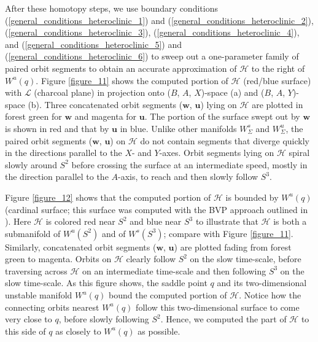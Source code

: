 \documentclass{ws-ijbc}
\begin{document}
After these homotopy steps, we use boundary conditions (\ref{general_conditions_heteroclinic_1}) and (\ref{general_conditions_heteroclinic_2}), (\ref{general_conditions_heteroclinic_3}), (\ref{general_conditions_heteroclinic_4}), and (\ref{general_conditions_heteroclinic_5}) and (\ref{general_conditions_heteroclinic_6}) to sweep out a one-parameter family of paired orbit segments to obtain an accurate approximation of $\mathscr{H}$ to the right of $W^u(q)$.  Figure \ref{figure_11} shows the computed portion of $\mathscr{H}$ (red/blue surface) with $\mathscr{L}$ (charcoal plane) in projection onto ($B$, $A$, $X$)-space (a) and ($B$, $A$, $Y$)-space (b).  Three concatenated orbit segments ($\mathbf{w}$, $\mathbf{u}$) lying on $\mathscr{H}$ are plotted in forest green for $\mathbf{w}$ and magenta for $\mathbf{u}$.  The portion of the surface swept out by $\mathbf{w}$ is shown in red and that by $\mathbf{u}$ in blue.  Unlike other manifolds $W^s_\Sigma$ and $W^u_\Sigma$, the paired orbit segments ($\mathbf{w}$, $\mathbf{u}$) on $\mathscr{H}$ do not contain segments that diverge quickly in the directions parallel to the $X$- and $Y$-axes.  Orbit segments lying on $\mathscr{H}$ spiral slowly around $S^2$ before crossing the surface at an intermediate speed, mostly in the direction parallel to the $A$-axis, to reach and then slowly follow $S^3$.

Figure \ref{figure_12} shows that the computed portion of $\mathscr{H}$ is bounded by $W^u(q)$ (cardinal surface; this surface was computed with the BVP approach outlined in \cite{Red_book}).  Here $\mathscr{H}$ is colored red near $S^2$ and blue near $S^3$ to illustrate that $\mathscr{H}$ is both a submanifold of $W^u(S^2)$ and of $W^s(S^3)$; compare with Figure \ref{figure_11}.  Similarly, concatenated orbit segments ($\mathbf{w}$, $\mathbf{u}$) are plotted fading from forest green to magenta.  Orbits on $\mathscr{H}$ clearly follow $S^2$ on the slow time-scale, before traversing across $\mathscr{H}$ on an intermediate time-scale and then following $S^3$ on the slow time-scale.  As this figure shows, the saddle point $q$ and its two-dimensional unstable manifold $W^u(q)$ bound the computed portion of $\mathscr{H}$.  Notice how the connecting orbits nearest $W^u(q)$ follow this two-dimensional surface to come very close to $q$, before slowly following $S^2$. Hence, we computed the part of $\mathscr{H}$ to this side of $q$ as closely to $W^u(q)$ as possible.
\end{document}
